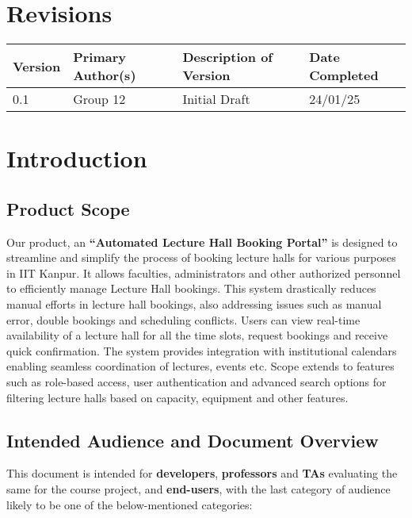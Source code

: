 \documentclass[a4paper,12pt]{article}
\begin{document}
\section*{Revisions}
\begin{tabular}{|l|l|l|l|}
\hline
\textbf{Version} & \textbf{Primary Author(s)} & \textbf{Description of Version} & \textbf{Date Completed} \\
\hline
0.1 & Group 12 & Initial Draft & 24/01/25 \\
\hline
\end{tabular}
\newpage

\section{Introduction} \label{sec:intro}
\subsection{Product Scope} \label{subsec:product_scope}
Our product, an \textbf{``Automated Lecture Hall Booking Portal''} is designed to streamline and simplify the process of booking lecture halls for various purposes in IIT Kanpur. It allows faculties, administrators and other authorized personnel to efficiently manage Lecture Hall bookings. This system drastically reduces manual efforts in lecture hall bookings, also addressing issues such as manual error, double bookings and scheduling conflicts. Users can view real-time availability of a lecture hall for all the time slots, request bookings and receive quick confirmation.
The system provides integration with institutional calendars enabling seamless coordination of lectures, events etc. Scope extends to features such as role-based access, user authentication and advanced search options for filtering lecture halls based on capacity, equipment and other features.


\subsection{Intended Audience and Document Overview} \label{subsec:intended_audience}
This document is intended for \textbf{developers}, \textbf{professors} and \textbf{TAs} evaluating the same for the course project, and \textbf{end-users}, with the last category of audience likely to be one of the below-mentioned categories:
\end{document}

